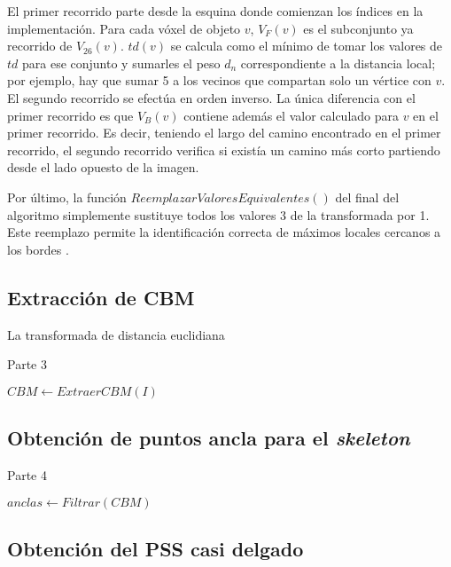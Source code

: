 El primer recorrido parte desde la esquina donde comienzan los índices en la implementación. Para cada vóxel de objeto $v$, $V_F(v)$ es el subconjunto ya recorrido de $V_{26}(v)$. $td(v)$ se calcula como el mínimo de tomar los valores de $td$ para ese conjunto y sumarles el peso $d_n$ correspondiente a la distancia local; por ejemplo, hay que sumar 5 a los vecinos que compartan solo un vértice con $v$. El segundo recorrido se efectúa en orden inverso. La única diferencia con el primer recorrido es que $V_B(v)$ contiene además el valor calculado para $v$ en el primer recorrido. Es decir, teniendo el largo del camino encontrado en el primer recorrido, el segundo recorrido verifica si existía un camino más corto partiendo desde el lado opuesto de la imagen.

Por último, la función $ReemplazarValoresEquivalentes()$ del final del algoritmo simplemente sustituye todos los valores 3 de la transformada por 1. Este reemplazo permite la identificación correcta de máximos locales cercanos a los bordes \cite{arcelli1988finding}.

\subsection{Extracción de CBM}

La transformada de distancia euclidiana

\begin{algorithm}[H]
\caption{Parte 3}
\begin{algorithmic}[1]
\State $CBM \gets ExtraerCBM(I)$
\end{algorithmic}
\end{algorithm}



\subsection{Obtención de puntos ancla para el \textit{skeleton}}

\begin{algorithm}[H]
\caption{Parte 4}
\begin{algorithmic}[1]
\State $anclas \gets Filtrar(CBM)$
\end{algorithmic}
\end{algorithm}

\subsection{Obtención del PSS casi delgado}

